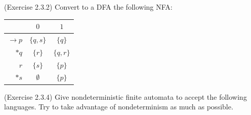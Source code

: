 \documentclass[10pt]{homework}
\begin{document}
\begin{solution}

\end{solution}

\begin{problem} (Exercise 2.3.2)
  Convert to a DFA the following NFA:\@
  \begin{table}[h]
    \centering
    \begin{tabular}{r||c|c} %
      & $0$ & $1$\\\hline\hline  %
      $\rightarrow p$ & $\{q, s\}$ & $\{q\}$\\
      $*q$ & $\{r\}$ & $\{q, r\}$\\
      $r$ & $\{s\}$ & $\{p\}$\\
      $*s$ & $\emptyset$ & $\{p\}$
    \end{tabular}
  \end{table}
\end{problem}

\begin{solution}

\end{solution}

\begin{problem} (Exercise 2.3.4) Give nondeterministic finite automata to accept
  the following languages.
  Try to take advantage of nondeterminism as much as possible.
\end{problem}

\begin{solution}

\end{solution}
\end{document}
